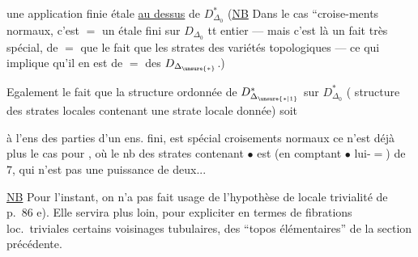 
 une application finie étale \uline{au dessus} de $D^*_{\Delta_0}$ (\uline{NB} Dans le cas ``croise-ments normaux, c'est $=$ un  étale fini sur $D_{\Delta_0}$ tt entier --- mais c'est là un fait très spécial, de $=$ que le fait que les  strates  des variétés topologiques --- ce qui implique  qu'il en est  de $=$ des $D_{\Delta_{\unsure{*}}}$.)

Egalement le fait que  la structure ordonnée  de $D^*_{\Delta_{\unsure{*|1}}}$ sur $D^*_{\Delta_0}$ ( structure  des strates locales contenant une strate locale donnée) soit   



à l'ens des parties d'un ens. fini, est spécial  croisements normaux ce n'est déjà plus le cas pour
, où le nb des strates contenant $\bullet$ est (en comptant $\bullet$ lui-$=$) de $7$, qui n'est pas une puissance de deux...

\uline{NB} Pour l'instant, on n'a pas fait usage de l'hypothèse  de locale trivialité de p.\ 86 e). Elle servira plus loin, pour expliciter en termes de fibrations loc.\ triviales certains voisinages tubulaires,   des ``topos élémentaires'' de la section précédente.

